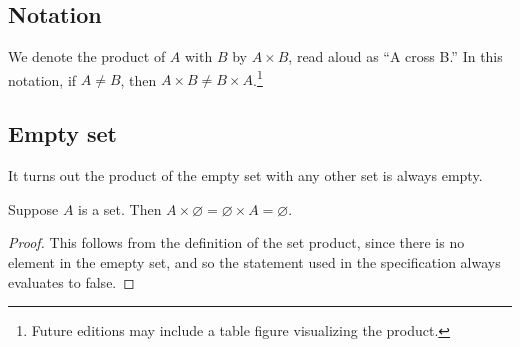 \subsection*{Notation}

We denote the product of $A$ with $B$ by $A \times  B$, read aloud as ``A cross B.''
In this notation, if $A \neq B$, then $A \times  B \neq B \times  A$.\footnote{Future editions may include a table figure visualizing the product.}

\subsection*{Empty set}

It turns out the product of the empty set with any other set is always empty.

\begin{proposition}
Suppose $A$ is a set.
Then $A \times  \varnothing = \varnothing \times  A = \varnothing$.
\begin{proof}This follows from the definition of the set product, since there is no element in the emepty set, and so the statement used in the specification always evaluates to false.\end{proof}\end{proposition}